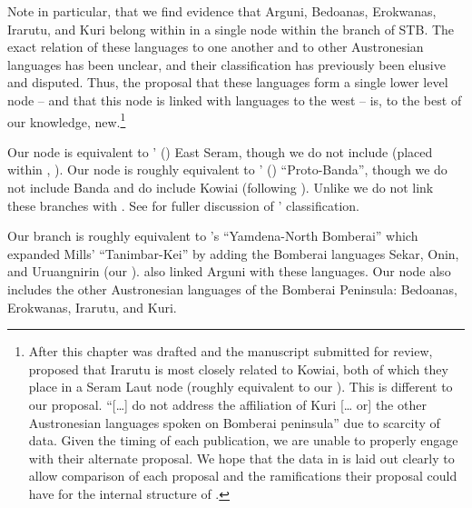Note in particular, that we find evidence that Arguni,
Bedoanas, Erokwanas, Irarutu, and Kuri belong within in a single
 node within the  branch of STB.
The exact relation of these languages to one another
and to other Austronesian languages has been unclear,
and their classification has previously been elusive and disputed.
Thus, the proposal that these languages form a single lower level
node -- and that this node is linked with languages to the west -- is,
to the best of our knowledge,
new.\footnote{\label{fn:SchapperZobel2024}
		After this chapter was drafted
		and the manuscript submitted for review,
		\citet{SchapperZobel2024b} proposed that Irarutu is most closely
		related to Kowiai, both of which they place in a Seram Laut node (roughly equivalent
		to our ).
		This is different to our proposal.
		\citet{SchapperZobel2024b} “[{\ldots}] do not address
		the affiliation of Kuri [{\ldots} or] the other Austronesian
		languages spoken on Bomberai peninsula” due to scarcity of data.
		Given the timing of each publication,
		we are unable to properly engage with their alternate proposal.
		We hope that the data in  %
		is laid out clearly to allow comparison of each
		proposal and the ramifications their proposal could have for
		the internal structure of .}

Our  node is equivalent to
\citeauthor{Collins1986}’ (\citeyear{Collins1986})
East Seram, though we do not include 
(placed within , ).
Our  node is roughly equivalent
 to \citeauthor{Collins1986}’ (\citeyear{Collins1986})
“Proto-Banda”, though we do not include Banda
and do include Kowiai (following \citealp{Zobel2014}).
Unlike \citet{Collins1986} we do not link these branches with .
See  for fuller discussion of \citeauthor{Collins1986}’ classification.

Our  branch is roughly
equivalent to \citeauthor{Blust1993}’s
\citeyear[276ff]{Blust1993} “Yamdena-North Bomberai” which expanded Mills’ “Tanimbar-Kei”
by adding the Bomberai languages Sekar,
Onin, and Uruangnirin (our ).
\citet{Blust1993} also linked Arguni with these languages.
Our  node also includes the other Austronesian
languages of the Bomberai Peninsula: Bedoanas, Erokwanas, Irarutu, and Kuri.

